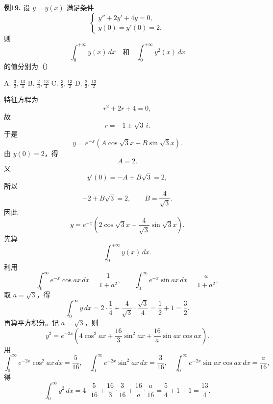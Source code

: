 \begin{problemblock}
\textbf{例19.} 设 \(y=y(x)\) 满足条件
\[
\begin{cases}
y''+2y'+4y=0,\\
y(0)=y'(0)=2,
\end{cases}
\]
则
\[
\int_0^{+\infty}y(x)\,dx
\quad\text{和}\quad
\int_0^{+\infty}y^2(x)\,dx
\]
的值分别为（\quad）

A. \(\displaystyle \frac32,\frac{13}{4}\)
\quad B. \(\displaystyle \frac23,\frac{13}{4}\)
\quad C. \(\displaystyle \frac32,\frac{13}{2}\)
\quad D. \(\displaystyle \frac23,\frac{13}{2}\)
\end{problemblock}
\begin{solutionblock}
特征方程为
\[
r^2+2r+4=0,
\]
故
\[
r=-1\pm \sqrt3\,i.
\]
于是
\[
y=e^{-x}\left(A\cos\sqrt3x+B\sin\sqrt3x\right).
\]
由 \(y(0)=2\)，得
\[
A=2.
\]
又
\[
y'(0)=-A+B\sqrt3=2,
\]
所以
\[
-2+B\sqrt3=2,\qquad B=\frac4{\sqrt3}.
\]
因此
\[
y=e^{-x}\left(2\cos\sqrt3x+\frac4{\sqrt3}\sin\sqrt3x\right).
\]
先算
\[
\int_0^{+\infty}y(x)\,dx.
\]
利用
\[
\int_0^\infty e^{-x}\cos ax\,dx=\frac1{1+a^2},\qquad
\int_0^\infty e^{-x}\sin ax\,dx=\frac{a}{1+a^2},
\]
取 \(a=\sqrt3\)，得
\[
\int_0^\infty y\,dx
=2\cdot\frac14+\frac4{\sqrt3}\cdot\frac{\sqrt3}{4}
=\frac12+1=\frac32.
\]
再算平方积分。记 \(a=\sqrt3\)，则
\[
y^2=e^{-2x}\left(4\cos^2 ax+\frac{16}{3}\sin^2 ax+\frac{16}{a}\sin ax\cos ax\right).
\]
用
\[
\int_0^\infty e^{-2x}\cos^2 ax\,dx=\frac5{16},\quad
\int_0^\infty e^{-2x}\sin^2 ax\,dx=\frac3{16},\quad
\int_0^\infty e^{-2x}\sin ax\cos ax\,dx=\frac{a}{16},
\]
得
\[
\int_0^\infty y^2\,dx
=4\cdot\frac5{16}
+\frac{16}{3}\cdot\frac3{16}
+\frac{16}{a}\cdot\frac{a}{16}
=\frac54+1+1
=\frac{13}{4}.
\]
\end{solutionblock}
